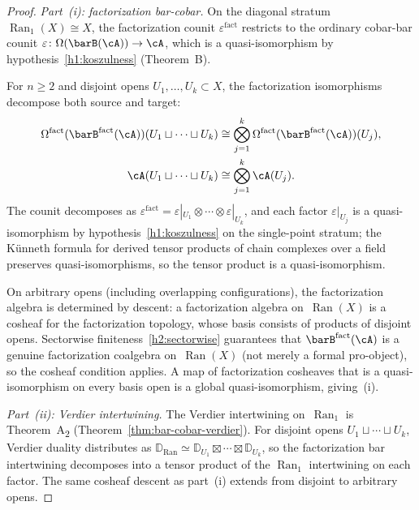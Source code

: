 \begin{proof}
\emph{Part~(i): factorization bar-cobar.}
On the diagonal stratum $\operatorname{Ran}_1(X) \cong X$, the
factorization counit $\varepsilon^{\mathrm{fact}}$ restricts to
the ordinary cobar-bar counit
$\varepsilon\colon \Omega(\barB(\cA)) \to \cA$,
which is a quasi-isomorphism by hypothesis~\ref{h1:koszulness}
(Theorem~B).

For $n \ge 2$ and disjoint opens
$U_1, \ldots, U_k \subset X$, the factorization isomorphisms
decompose both source and target:
\begin{align*}
\Omega^{\mathrm{fact}}(\barB^{\mathrm{fact}}(\cA))
  (U_1 \sqcup \cdots \sqcup U_k)
&\cong \bigotimes_{j=1}^k
  \Omega^{\mathrm{fact}}(\barB^{\mathrm{fact}}(\cA))(U_j), \\
\cA(U_1 \sqcup \cdots \sqcup U_k)
&\cong \bigotimes_{j=1}^k \cA(U_j).
\end{align*}
The counit decomposes as $\varepsilon^{\mathrm{fact}}
= \varepsilon|_{U_1} \otimes \cdots \otimes \varepsilon|_{U_k}$,
and each factor $\varepsilon|_{U_j}$ is a quasi-isomorphism
by hypothesis~\ref{h1:koszulness} on the single-point stratum;
the K\"unneth formula for derived tensor products of chain
complexes over a field preserves quasi-isomorphisms, so the
tensor product is a quasi-isomorphism.

On arbitrary opens (including overlapping configurations), the
factorization algebra is determined by descent: a factorization
algebra on~$\operatorname{Ran}(X)$ is a cosheaf for the
factorization topology, whose basis consists of products of disjoint
opens.  Sectorwise finiteness~\ref{h2:sectorwise} guarantees that
$\barB^{\mathrm{fact}}(\cA)$ is a genuine factorization coalgebra
on~$\operatorname{Ran}(X)$ (not merely a formal pro-object), so
the cosheaf condition applies.  A map of factorization cosheaves
that is a quasi-isomorphism on every basis open is a global
quasi-isomorphism, giving~(i).

\emph{Part~(ii): Verdier intertwining.}
The Verdier intertwining on~$\operatorname{Ran}_1$ is
Theorem~A\textsubscript{2}
(Theorem~\ref{thm:bar-cobar-verdier}).
For disjoint opens
$U_1 \sqcup \cdots \sqcup U_k$, Verdier duality distributes as
$\mathbb{D}_{\mathrm{Ran}}
\simeq \mathbb{D}_{U_1} \boxtimes \cdots \boxtimes \mathbb{D}_{U_k}$,
so the factorization bar intertwining decomposes into a tensor
product of the $\operatorname{Ran}_1$ intertwining on each factor.
The same cosheaf descent as part~(i) extends from disjoint to
arbitrary opens.


\end{proof}
